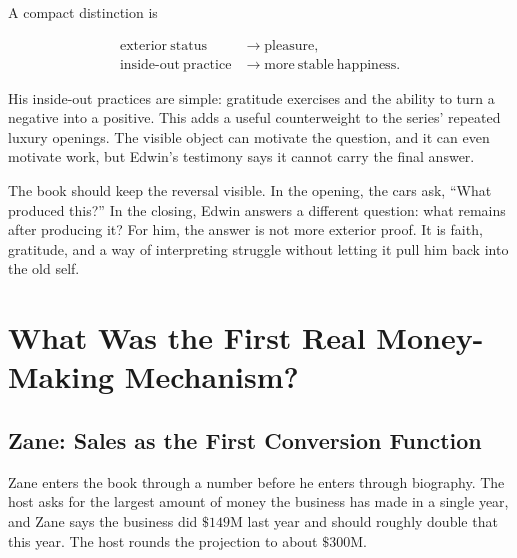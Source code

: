 \documentclass[11pt,oneside]{book}
\begin{document}
A compact distinction is

\begin{align}
\mathrm{exterior\ status} &\rightarrow \mathrm{pleasure},\\
\mathrm{inside\mbox{-}out\ practice} &\rightarrow \mathrm{more\ stable\ happiness}.
\end{align}

His inside-out practices are simple: gratitude exercises and the ability to turn a negative into a positive. This adds a useful counterweight to the series' repeated luxury openings. The visible object can motivate the question, and it can even motivate work, but Edwin's testimony says it cannot carry the final answer.

The book should keep the reversal visible. In the opening, the cars ask, ``What produced this?'' In the closing, Edwin answers a different question: what remains after producing it? For him, the answer is not more exterior proof. It is faith, gratitude, and a way of interpreting struggle without letting it pull him back into the old self.


\chapter{What Was the First Real Money-Making Mechanism?}

\section{Zane: Sales as the First Conversion Function}

Zane enters the book through a number before he enters through biography. The host asks for the largest amount of money the business has made in a single year, and Zane says the business did \(\$149\mathrm{M}\) last year and should roughly double that this year. The host rounds the projection to about \(\$300\mathrm{M}\).
\end{document}
